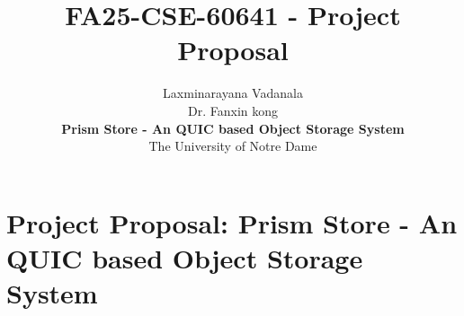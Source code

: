 \documentclass[12pt]{article}
\newcommand\defaultstyle{\everymath{\displaystyle}}
\begin{document}
\defaultstyle
\title{\vspace{-8ex}FA25-CSE-60641 - Project Proposal}

\author
    {   
        Laxminarayana Vadanala\\
        Dr. Fanxin kong\\
        \textbf{Prism Store - An QUIC based Object Storage System}\\
        The University of Notre Dame \vspace{-1.75ex}
    }
 
\maketitle


\section*{Project Proposal: Prism Store - An QUIC based Object Storage System}
\end{document}
